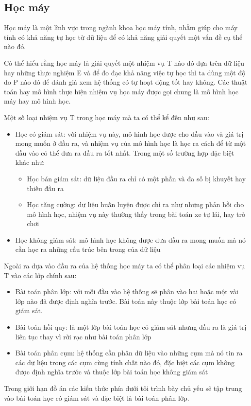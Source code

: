 \documentclass[fontsize=12pt]{scrartcl}
\begin{document}
\subsection{Học máy\textsuperscript{\cite{ wiki:machine_learning}}}
Học máy là một lĩnh vực trong ngành khoa học máy tính, nhằm giúp cho máy tính có khả năng tự học từ dữ liệu để có khả năng giải quyết một vấn đề cụ thể nào đó.
\par
Có thể hiểu rằng học máy là giải quyết một nhiệm vụ T nào đó dựa trên dữ liệu hay những thực nghiệm E và để đo đạc khả năng việc tự học thì ta dùng một độ đo P nào đó để đánh giá xem hệ thống có tự hoạt động tốt hay không. Các thuật toán hay mô hình thực hiện nhiệm vụ học máy được gọi chung là mô hình học máy hay mô hình học.
\par
Một số loại nhiệm vụ T trong học máy mà ta có thể kể đến như sau:
\begin{itemize}
\item Học có giám sát: với nhiệm vụ này, mô hình học được cho đầu vào và giá trị mong muốn ở đầu ra, và nhiệm vụ của mô hình học là học ra cách để từ một đầu vào có thể đưa ra đầu ra tốt nhất. Trong một số trường hợp đặc biệt khác như:
\begin{itemize}
\item Học bán giám sát: dữ liệu đầu ra chỉ có một phần và đa số bị khuyết hay thiếu đầu ra
\item Học tăng cường: dữ liệu huấn luyện được chỉ ra như những phản hồi cho mô hình học, nhiệm vụ này thường thấy trong bài toán xe tự lái, hay trò chơi
\end{itemize}
\item Học không giám sát: mô hình học không được đưa đầu ra mong muốn mà nó cần học ra những cấu trúc bên trong của dữ liệu
\end{itemize}
Ngoài ra dựa vào đầu ra của hệ thống học máy ta có thể phân loại các nhiệm vụ T vào các lớp chính sau:
\begin{itemize}
\item Bài toán phân lớp: với mỗi đầu vào hệ thống sẽ phân vào hai hoặc một vài lớp nào đã được định nghĩa trước. Bài toán này thuộc lớp bài toán học có giám sát.
\item Bài toán hồi quy: là một lớp bài toán học có giám sát nhưng đầu ra là giá trị liên tục thay vì rời rạc như bài toán phân lớp
\item Bài toán phân cụm: hệ thống cần phân dữ liệu vào những cụm mà nó tin ra các dữ liệu trong các cụm cùng tính chất nào đó, đặc biệt các cụm không được định nghĩa trước và thuộc lớp bài toán học không giám sát
\end{itemize}
Trong giới hạn đồ án các kiến thức phía dưới tôi trình bày chủ yếu sẽ tập trung vào bài toán học có giám sát và đặc biệt là bài toán phân lớp.
\end{document}
